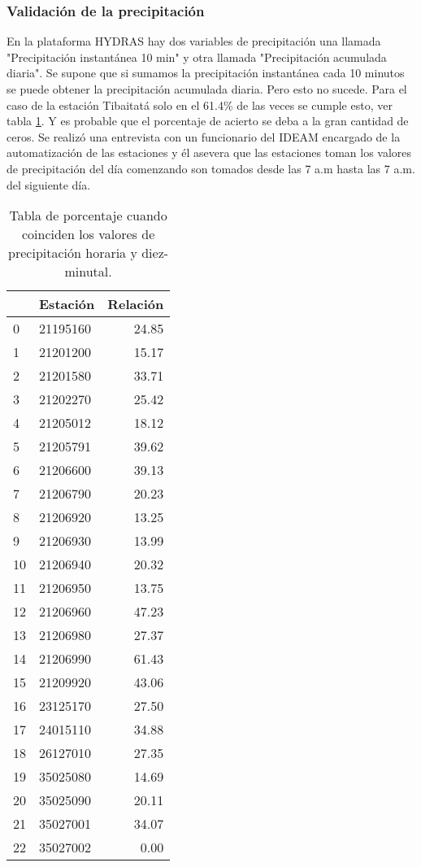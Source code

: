 \documentclass[11pt]{article}
\begin{document}
\subsubsection{Validación de la precipitación}

En la plataforma HYDRAS hay dos variables de precipitación una llamada "Precipitación instantánea 10 min" y otra llamada "Precipitación acumulada diaria". Se supone que si sumamos la precipitación instantánea cada 10 minutos se puede obtener la precipitación acumulada diaria. Pero esto no sucede. Para el caso de la estación Tibaitatá solo en el 61.4\% de las veces se cumple esto, ver tabla \ref{table:compar-porcentaje}. Y es probable que el porcentaje de acierto se deba a la gran cantidad de ceros. Se realizó una entrevista con un funcionario del IDEAM encargado de la automatización de las estaciones y él asevera que las estaciones toman los valores de precipitación del día comenzando son tomados desde las 7 a.m hasta las 7 a.m. del siguiente día.

\begin{table}[H]
\begin{center}

\begin{tabular}{llr}
\toprule
{} &  Estación &  Relación \\
\midrule
0  &  21195160 &     24.85 \\
1  &  21201200 &     15.17 \\
2  &  21201580 &     33.71 \\
3  &  21202270 &     25.42 \\
4  &  21205012 &     18.12 \\
5  &  21205791 &     39.62 \\
6  &  21206600 &     39.13 \\
7  &  21206790 &     20.23 \\
8  &  21206920 &     13.25 \\
9  &  21206930 &     13.99 \\
10 &  21206940 &     20.32 \\
11 &  21206950 &     13.75 \\
12 &  21206960 &     47.23 \\
13 &  21206980 &     27.37 \\
14 &  21206990 &     61.43 \\
15 &  21209920 &     43.06 \\
16 &  23125170 &     27.50 \\
17 &  24015110 &     34.88 \\
18 &  26127010 &     27.35 \\
19 &  35025080 &     14.69 \\
20 &  35025090 &     20.11 \\
21 &  35027001 &     34.07 \\
22 &  35027002 &      0.00 \\
\bottomrule
\end{tabular}
\caption{Tabla de porcentaje cuando coinciden los valores de precipitación horaria y diez-minutal.}
\label{table:compar-porcentaje}
\end{center}
\end{table}
\end{document}
